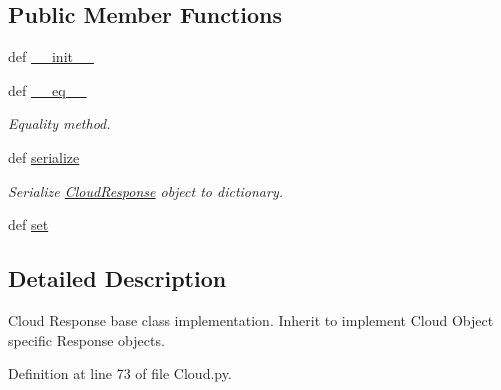 \subsection*{Public Member Functions}
\begin{DoxyCompactItemize}
\item 
def \hyperlink{classRappCloud_1_1CloudMsgs_1_1Cloud_1_1CloudResponse_ad211d2c1a9767f5a67cef92e887755d1}{\-\_\-\-\_\-init\-\_\-\-\_\-}
\item 
def \hyperlink{classRappCloud_1_1CloudMsgs_1_1Cloud_1_1CloudResponse_aec471d2ed8408ef18f60735400b9def7}{\-\_\-\-\_\-eq\-\_\-\-\_\-}
\begin{DoxyCompactList}\small\item\em Equality method. \end{DoxyCompactList}\item 
def \hyperlink{classRappCloud_1_1CloudMsgs_1_1Cloud_1_1CloudResponse_a5e7a483fa6ca09512cd5bf980465a110}{serialize}
\begin{DoxyCompactList}\small\item\em Serialize \hyperlink{classRappCloud_1_1CloudMsgs_1_1Cloud_1_1CloudResponse}{Cloud\-Response} object to dictionary. \end{DoxyCompactList}\item 
def \hyperlink{classRappCloud_1_1CloudMsgs_1_1Cloud_1_1CloudResponse_aa60d9510ed21539c27e8c7155907973a}{set}
\end{DoxyCompactItemize}


\subsection{Detailed Description}
\begin{DoxyVerb}Cloud Response base class implementation. Inherit to implement
Cloud Object specific Response objects.
\end{DoxyVerb}
 

Definition at line 73 of file Cloud.\-py.




